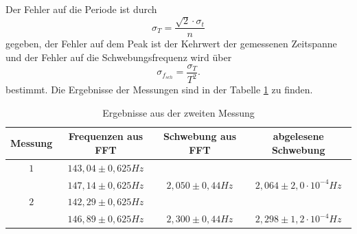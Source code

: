 \documentclass[a4paper, 11pt]{article}
\begin{document}
Der Fehler auf die Periode ist durch 
\begin{equation}
\sigma_T = \frac{\surd2 \cdot \sigma_t}{n}
\end{equation}
gegeben, der Fehler auf dem Peak ist der Kehrwert der gemessenen Zeitspanne und der Fehler auf die Schwebungsfrequenz wird über
\begin{equation}
\sigma_{f_{sch}} = \frac{\sigma_T}{T^2}. 
\end{equation}
bestimmt. Die Ergebnisse der Messungen sind in der Tabelle \ref{Tabelle 4} zu finden.
\begin{table}[H]
\centering
\begin{tabular}{|c|c|c|c|}
\hline Messung & Frequenzen aus FFT & Schwebung aus FFT & abgelesene Schwebung \\
\hline $1$ & $143,04 \pm 0,625 Hz$ & & \\
           & $147,14 \pm 0,625 Hz$ & $2,050 \pm 0,44 Hz$ & $2,064 	\pm 2,0 \cdot 10^{-4} Hz $ \\
\hline $2$ & $142,29 \pm 0,625 Hz$ &  &    \\
 		& $146,89 \pm 0,625 Hz$ & $2,300 \pm 0,44 Hz$  & $2,298 \pm 1,2 \cdot 10^{-4} Hz$ \\
\hline
\end{tabular}
\caption{Ergebnisse aus der zweiten Messung}
\label{Tabelle 4}
\end{table}
\end{document}

